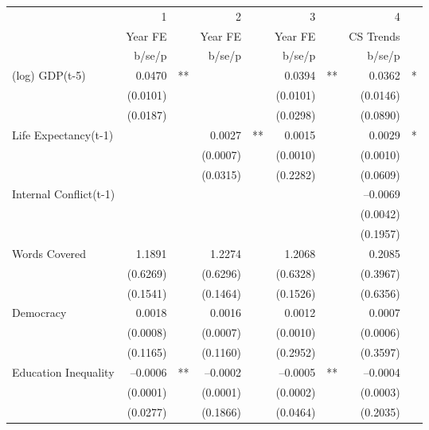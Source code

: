 \begin{tabular} {l* {4}{r @{} l}}
\hline
            &           1&   &           2&   &           3&   &           4&   \\
            &     Year FE&   &     Year FE&   &     Year FE&   &   CS Trends&   \\
            &      b/se/p&   &      b/se/p&   &      b/se/p&   &      b/se/p&   \\
\hline
(log) GDP(t-5)&      0.0470&** &            &   &      0.0394&** &      0.0362&*  \\
            &    (0.0101)&   &            &   &    (0.0101)&   &    (0.0146)&   \\
            &    (0.0187)&   &            &   &    (0.0298)&   &    (0.0890)&   \\
Life Expectancy(t-1) &            &   &      0.0027&** &      0.0015&   &      0.0029&*  \\
            &            &   &    (0.0007)&   &    (0.0010)&   &    (0.0010)&   \\
            &            &   &    (0.0315)&   &    (0.2282)&   &    (0.0609)&   \\
Internal Conflict(t-1)&            &   &            &   &            &   &    --0.0069&   \\
            &            &   &            &   &            &   &    (0.0042)&   \\
            &            &   &            &   &            &   &    (0.1957)&   \\
Words Covered&      1.1891&   &      1.2274&   &      1.2068&   &      0.2085&   \\
            &    (0.6269)&   &    (0.6296)&   &    (0.6328)&   &    (0.3967)&   \\
            &    (0.1541)&   &    (0.1464)&   &    (0.1526)&   &    (0.6356)&   \\
Democracy   &      0.0018&   &      0.0016&   &      0.0012&   &      0.0007&   \\
            &    (0.0008)&   &    (0.0007)&   &    (0.0010)&   &    (0.0006)&   \\
            &    (0.1165)&   &    (0.1160)&   &    (0.2952)&   &    (0.3597)&   \\
Education Inequality&    --0.0006&** &    --0.0002&   &    --0.0005&** &    --0.0004&   \\
            &    (0.0001)&   &    (0.0001)&   &    (0.0002)&   &    (0.0003)&   \\
            &    (0.0277)&   &    (0.1866)&   &    (0.0464)&   &    (0.2035)&   \\

\end{tabular}
